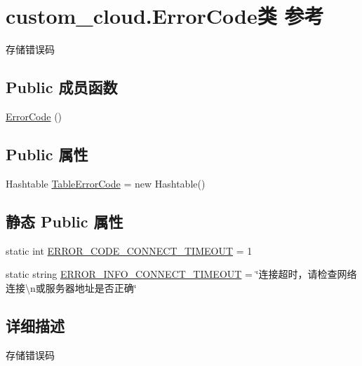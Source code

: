 \hypertarget{classcustom__cloud_1_1_error_code}{}\section{custom\+\_\+cloud.\+Error\+Code类 参考}
\label{classcustom__cloud_1_1_error_code}


存储错误码  


\subsection*{Public 成员函数}
\begin{DoxyCompactItemize}
\item 
\hyperlink{classcustom__cloud_1_1_error_code_a2b401622d9ad3feb421d4b86a3a37b63}{Error\+Code} ()
\end{DoxyCompactItemize}
\subsection*{Public 属性}
\begin{DoxyCompactItemize}
\item 
Hashtable \hyperlink{classcustom__cloud_1_1_error_code_a9de683228e313da416bb8232b987c09f}{Table\+Error\+Code} = new Hashtable()
\end{DoxyCompactItemize}
\subsection*{静态 Public 属性}
\begin{DoxyCompactItemize}
\item 
static int \hyperlink{classcustom__cloud_1_1_error_code_ada610647d2cd6418dadbf06b6fa3c6c6}{E\+R\+R\+O\+R\+\_\+\+C\+O\+D\+E\+\_\+\+C\+O\+N\+N\+E\+C\+T\+\_\+\+T\+I\+M\+E\+O\+UT} = 1
\item 
static string \hyperlink{classcustom__cloud_1_1_error_code_a9931216a423c62a9dd17574f8cdbe20d}{E\+R\+R\+O\+R\+\_\+\+I\+N\+F\+O\+\_\+\+C\+O\+N\+N\+E\+C\+T\+\_\+\+T\+I\+M\+E\+O\+UT} = \char`\"{}连接超时，请检查网络连接\textbackslash{}n或服务器地址是否正确\char`\"{}
\end{DoxyCompactItemize}


\subsection{详细描述}
存储错误码 



